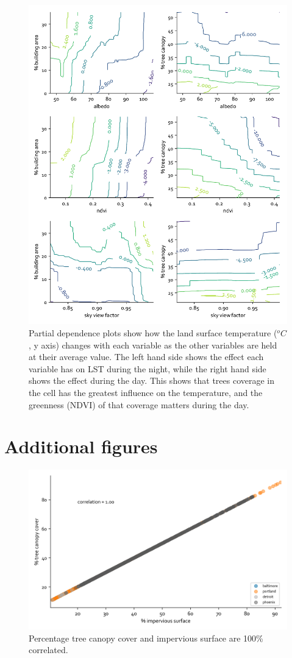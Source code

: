\documentclass[final,3p,times,twocolumn,sort&compress]{elsarticle}
\begin{document}
\begin{figure}[h]
    \centering
    \includegraphics[width=\linewidth]{fig/report/pdp_2d_day_100.pdf}
    \caption{
    Partial dependence plots show how the land surface temperature ($^oC$, y axis) changes with each variable as the other variables are held at their average value. The left hand side shows the effect each variable has on LST during the night, while the right hand side shows the effect during the day. This shows that trees coverage in the cell has the greatest influence on the temperature, and the greenness (NDVI) of that coverage matters during the day.
    }
    \label{fig:pdp_2dday}
\end{figure}


\clearpage
\section{Additional figures}
\begin{figure}[h]
    \centering
    \includegraphics[width=\linewidth]{fig/report/imp_v_tree_500.png}
    \caption{
    Percentage tree canopy cover and impervious surface are 100\% correlated.
    }
    \label{fig:imp_tree}
\end{figure}
\end{document}
